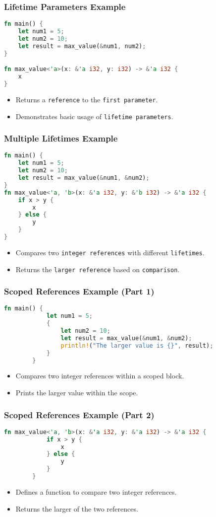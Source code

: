 \documentclass[aspectratio=169, table]{beamer}
\begin{document}
\begin{frame}[fragile]
\frametitle{Lifetime Parameters Example}
\begin{lstlisting}[language=Rust]
fn main() {
	let num1 = 5;
	let num2 = 10;
	let result = max_value(&num1, num2);
}

fn max_value<'a>(x: &'a i32, y: i32) -> &'a i32 {
	x
}
\end{lstlisting}
\begin{itemize}
\item Returns a \texttt{reference} to the \texttt{first\ parameter}.
\item Demonstrates basic usage of \texttt{lifetime\ parameters}.
\end{itemize}
\end{frame}

\begin{frame}[fragile]
\frametitle{Multiple Lifetimes Example}
\vspace{15pt}
\begin{lstlisting}[language=Rust]
fn main() {
	let num1 = 5;
	let num2 = 10;
	let result = max_value(&num1, &num2);
}
fn max_value<'a, 'b>(x: &'a i32, y: &'b i32) -> &'a i32 {
	if x > y {
		x
	} else {
		y
	}
}
\end{lstlisting}
\begin{itemize}
\item Compares two \texttt{integer\ references} with different \texttt{lifetimes}.
\item Returns the \texttt{larger\ reference} based on \texttt{comparison}.
\end{itemize}
\end{frame}

\begin{frame}[fragile]
	\frametitle{Scoped References Example (Part 1)}
	\begin{lstlisting}[language=Rust]
		fn main() {
			let num1 = 5;
			{
				let num2 = 10;
				let result = max_value(&num1, &num2);
				println!("The larger value is {}", result);
			}
		}
	\end{lstlisting}
	\begin{itemize}
		\item Compares two integer references within a scoped block.
		\item Prints the larger value within the scope.
	\end{itemize}
\end{frame}

\begin{frame}[fragile]
	\frametitle{Scoped References Example (Part 2)}
	\begin{lstlisting}[language=Rust]
		fn max_value<'a, 'b>(x: &'a i32, y: &'a i32) -> &'a i32 {
			if x > y {
				x
			} else {
				y
			}
		}
	\end{lstlisting}
	\begin{itemize}
		\item Defines a function to compare two integer references.
		\item Returns the larger of the two references.
	\end{itemize}
\end{frame}
\end{document}
